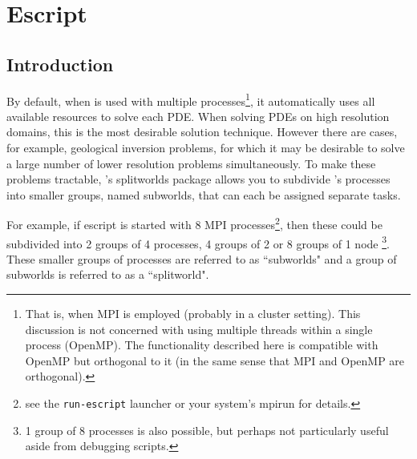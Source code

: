 
%
%
%

\chapter{Escript }
\label{CHAP:subworld}
\section{Introduction}
By default, when \escript is used with multiple processes\footnote{That is, when MPI is employed 
(probably in a cluster setting).
This discussion is not concerned with using multiple threads within a single process (OpenMP).
The functionality described here is compatible with OpenMP but orthogonal to it (in the same sense that MPI and OpenMP are
orthogonal).}, it automatically uses all available resources to solve each PDE. 
When solving PDEs on high resolution domains, this is the most desirable solution technique. 
However there are cases, for example, geological inversion problems, for which it may be desirable to solve a large number of lower resolution problems simultaneously. 
To make these problems tractable, \escript's splitworlds package allows you to subdivide \escript's processes into smaller groups, named subworlds, that can each be assigned separate tasks.

\vspace{\baselineskip}
\noindent For example, if escript is started with 8 MPI processes\footnote{see the \texttt{run-escript} launcher or 
your system's mpirun for details.}, then these could be subdivided into 2 groups of 4 processes, 4 groups of 2 or 8 groups of 1 node
\footnote{1 group of 8 processes is also possible, but perhaps not particularly useful aside from debugging scripts.}. These smaller groups of processes are referred to as ``subworlds" and a group of subworlds is referred to as a ``splitworld".

